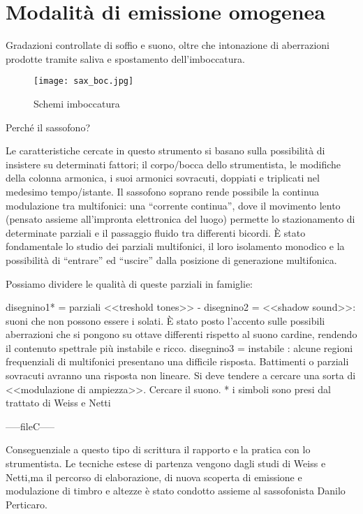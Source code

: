 \section{Modalità di emissione omogenea}

Gradazioni controllate di soffio e suono, oltre che intonazione di aberrazioni prodotte tramite saliva e spostamento dell'imboccatura.

\begin{figure}
\centering
{\texttt{[image: sax\_boc.jpg]}}
\caption[Pianta S. Luca]{Schemi imboccatura}
\label{fig:tetratetra}
\end{figure}

Perché il sassofono?

Le caratteristiche cercate in questo strumento si basano sulla possibilità
di insistere su determinati fattori; il corpo/bocca dello strumentista,
le modifiche della colonna armonica, i suoi armonici sovracuti, doppiati
e triplicati nel medesimo tempo/istante.
Il sassofono soprano rende possibile la continua modulazione tra multifonici:
una “corrente continua”,  dove il movimento lento (pensato assieme all'impronta
elettronica del luogo) permette lo stazionamento di determinate parziali
e il passaggio fluido tra differenti bicordi. È stato fondamentale lo studio
dei parziali multifonici, il loro isolamento monodico e la possibilità di
“entrare” ed “uscire” dalla posizione di generazione multifonica.

Possiamo dividere le qualità di queste parziali in famiglie:

disegnino1* = parziali <<treshold tones>>  -
disegnino2 = <<shadow sound>>: suoni che non possono essere i solati.
È stato posto l’accento sulle possibili aberrazioni che si pongono su ottave differenti
rispetto al suono cardine, rendendo il contenuto spettrale più instabile e ricco.
disegnino3 = instabile : alcune regioni frequenziali di multifonici presentano una
difficile risposta. Battimenti o parziali sovracuti avranno una risposta non lineare.
Si deve tendere a cercare una sorta di <<modulazione di ampiezza>>. Cercare il suono.
* i simboli sono presi dal trattato di Weiss e Netti



-----fileC-----



Conseguenziale a questo tipo di scrittura il  rapporto e la pratica con lo strumentista.
Le tecniche estese di partenza vengono dagli studi di Weiss e Netti,ma il percorso di
elaborazione, di nuova scoperta di emissione e modulazione di timbro e altezze è
stato condotto assieme al sassofonista Danilo Perticaro.

